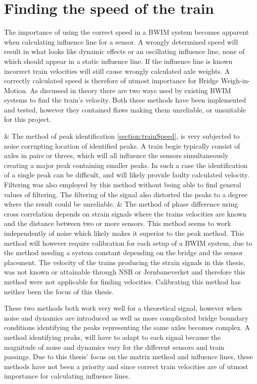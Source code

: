 \section{Finding the speed of the train}
The importance of using the correct speed in a BWIM system becomes apparent when calculating influence line for a sensor. A wrongly determined speed will result in what looks like dynamic effects or an oscillating influence line, none of which should appear in a static influence line. If the influence line is known incorrect train velocities will still cause wrongly calculated axle weights. A correctly calculated speed is therefore of utmost importance for Bridge Weigh-in-Motion.
As discussed in theory there are two ways used by existing BWIM systems to find the train's velocity. Both these methods have been implemented and tested, however they contained flaws making them unreliable, or unsuitable for this project.
\begin{easylist}[itemize]
 & The method of peak identification \ref{section:trainSpeed}, is very subjected to noise corrupting location of identified peaks. A train bogie typically consist of axles in pairs or threes, which will all influence the sensors simultaneously creating a major peak containing smaller peaks. In such a case the identification of a single peak can be difficult, and will likely provide faulty calculated velocity. Filtering was also employed by this method without being able to find general values of filtering. The filtering of the signal also distorted the peaks to a degree where the result could be unreliable.
 & The method of phase difference using cross correlation depends on strain signals where the trains velocities are known and the distance between two or more sensors. This method seems to work independently of noise which likely makes it superior to the peak method. This method will however require calibration for each setup of a BWIM system, due to the method needing a system constant depending on the bridge and the sensor placement. The velocity of the trains producing the strain signals in this thesis, was not known or attainable through NSB or Jernbaneverket and therefore this method were not applicable for finding velocities. Calibrating this method has neither been the focus of this thesis.
\end{easylist}
These two methods both work very well for a theoretical signal, however when noise and dynamics are introduced as well as more complicated bridge boundary conditions identifying the peaks representing the same axles becomes complex. A method identifying peaks, will have to adapt to each signal because the magnitude of noise and dynamics vary for the different sensors and train passings. Due to this thesis' focus on the matrix method and influence lines, these methods have not been a priority and since correct train velocities are of utmost importance for calculating influence lines.

